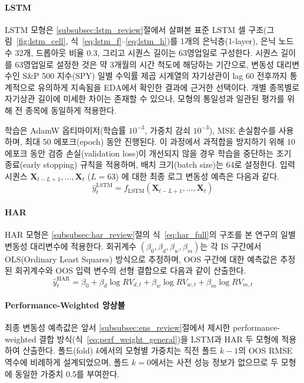 \documentclass{article}
\begin{document}
\paragraph{LSTM}
LSTM 모형은 \ref{subsubsec:lstm_review}절에서 살펴본 표준 LSTM 셀 구조(그림~\ref{fig:lstm_cell}, 식~\ref{eq:lstm_f}--\ref{eq:lstm_h})를 1개의 은닉층(1-layer), 은닉 노드 수 32개, 드롭아웃 비율 0.3, 그리고 시퀀스 길이는 63영업일로 구성한다. 시퀀스 길이를 63영업일로 설정한 것은 약 3개월의 시간 척도에 해당하는 기간으로, 변동성 대리변수인 S\&P 500 지수(SPY) 일별 수익률 제곱 시계열의 자기상관이 lag 60 전후까지 통계적으로 유의하게 지속됨을 EDA에서 확인한 결과에 근거한 선택이다. 개별 종목별로 자기상관 길이에 미세한 차이는 존재할 수 있으나, 모형의 통일성과 일관된 평가를 위해 전 종목에 동일하게 적용한다.

학습은 AdamW 옵티마이저(학습률 $10^{-3}$, 가중치 감쇠 $10^{-3}$), MSE 손실함수를 사용하며, 최대 50 에포크(epoch) 동안 진행된다. 이 과정에서 과적합을 방지하기 위해 10 에포크 동안 검증 손실(validation loss)이 개선되지 않을 경우 학습을 중단하는 조기 종료(early stopping) 규칙을 적용하며, 배치 크기(batch size)는 64로 설정한다. 입력 시퀀스 $\mathbf{X}_{t-L+1}, \ldots, \mathbf{X}_t$ ($L=63$) 에 대한 최종 로그 변동성 예측은 다음과 같다.
\begin{equation}
\hat{y}^{\text{LSTM}}_t = f_{\text{LSTM}}(\mathbf{X}_{t-L+1}, \ldots,
\mathbf{X}_t)
\label{eq:lstm_pred}
\end{equation}

\paragraph{HAR}
HAR 모형은 \ref{subsubsec:har_review}절의 식~\ref{eq:har_full}의 구조를 본 연구의 일별 변동성 대리변수에 적용한다. 회귀계수
$(\beta_0, \beta_d, \beta_w, \beta_m)$는 각 IS 구간에서 OLS(Ordinary Least Squares) 방식으로 추정하며, OOS 구간에 대한 예측값은 추정된 회귀계수와 OOS 입력 변수의 선형 결합으로 다음과 같이 산출한다.
\begin{equation}
\hat{y}^{\text{HAR}}_t = \beta_0 + \beta_d \log RV_{d,t} + \beta_w \log
RV_{w,t}+ \beta_m \log RV_{m,t}
\label{eq:har_pred_impl}
\end{equation}

\paragraph{Performance-Weighted 앙상블}
최종 변동성 예측값은 앞서 \ref{subsubsec:ens_review}절에서 제시한 performance-weighted 결합 방식(식~\ref{eq:perf_weight_general})을 LSTM과 HAR 두 모형에 적용하여 산출한다. 폴드(fold) $k$에서의 모형별 가중치는 직전 폴드 $k-1$의 OOS RMSE 역수에 비례하게 설계되었으며, 폴드 $k=0$에서는 사전 성능 정보가 없으므로 두 모형에 동일한 가중치 0.5를 부여한다.
\end{document}
